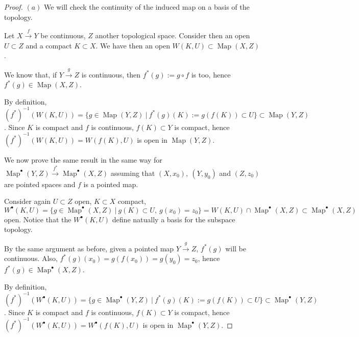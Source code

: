 \documentclass{article}
\DeclareMathOperator{\Map}{Map}
\begin{document}
\begin{proof}
	$(a)$ We will check the continuity of the induced map on a basis of the topology.
	
	Let $X\xrightarrow{f}Y$ be continuous, $Z$ another topological space. Consider then an open $U\subset Z$ and a compact $K\subset X$. We have then an open $W(K,U)\subset\Map(X,Z)$.
	
	We know that, if $Y\xrightarrow{g}Z$ is continuous, then $f^*(g):=g\circ f$ is too, hence $f^*(g)\in\Map(X,Z)$.
	
	By definition, $(f^*)^{-1}(W(K,U))=\{g\in\Map(Y,Z)\ |\ f^*(g)(K):=g(f(K))\subset U\}\subset\Map(Y,Z)$. Since $K$ is compact and $f$ is continuous, $f(K)\subset Y$ is compact, hence $(f^*)^{-1}(W(K,U))=W(f(K),U)$ is open in $\Map(Y,Z)$.
	
	We now prove the same result in the same way for $\Map^{\bullet}(Y,Z)\xrightarrow{f^*}\Map^{\bullet}(X,Z)$ assuming that $(X,x_0),\ (Y,y_0)$ and $(Z,z_0)$ are pointed spaces and $f$ is a pointed map.
	
	Consider again $U\subset Z$ open, $K\subset X$ compact, $W^{\bullet}(K,U)=\{g\in\Map^{\bullet}(X,Z)\ |\ g(K)\subset U,\ g(x_0)=z_0\}=W(K,U)\cap\Map^{\bullet}(X,Z)\subset\Map^{\bullet}(X,Z)$ open. Notice that the $W^{\bullet}(K,U)$ define natually a basis for the subspace topology.
	
	By the same argument as before, given a pointed map $Y\xrightarrow{g}Z$, $f^*(g)$ will be continuous. Also, $f^*(g)(x_0)=g(f(x_0))=g(y_0)=z_0$, hence $f^*(g)\in\Map^{\bullet}(X,Z)$.
	
	By definition, $(f^*)^{-1}(W^{\bullet}(K,U))=\{g\in\Map^{\bullet}(Y,Z)\ |\ f^*(g)(K):=g(f(K))\subset U\}\subset\Map^{\bullet}(Y,Z)$. Since $K$ is compact and $f$ is continuous, $f(K)\subset Y$ is compact, hence $(f^*)^{-1}(W^{\bullet}(K,U))=W^{\bullet}(f(K),U)$ is open in $\Map^{\bullet}(Y,Z)$.
\end{proof}
\end{document}
